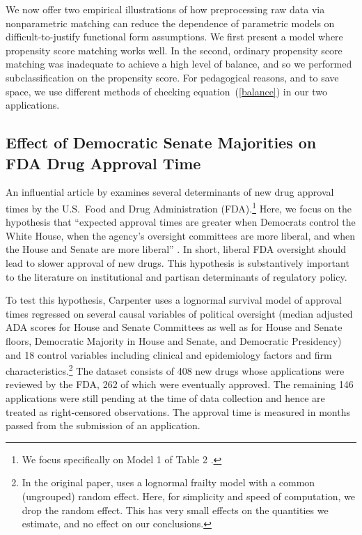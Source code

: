 \documentclass[11pt,titlepage]{article}
\begin{document}
We now offer two empirical illustrations of how preprocessing raw data
via nonparametric matching can reduce the dependence of parametric
models on difficult-to-justify functional form assumptions.  We first
present a model where propensity score matching works well.  In the
second, ordinary propensity score matching was inadequate to achieve a
high level of balance, and so we performed subclassification on the
propensity score. For pedagogical reasons, and to save space, we use
different methods of checking equation~(\ref{balance}) in our two
applications.

\subsection{Effect of Democratic Senate Majorities on FDA Drug Approval Time}

An influential article by \citet{Carp02} examines several determinants
of new drug approval times by the U.S.\ Food and Drug Administration
(FDA).\footnote{We focus specifically on Model 1 of Table 2 \citep[p.
  499]{Carp02}.}  Here, we focus on the hypothesis that ``expected
approval times are greater when Democrats control the White House,
when the agency's oversight committees are more liberal, and when the
House and Senate are more liberal'' \citep[p.495]{Carp02}.  In short,
liberal FDA oversight should lead to slower approval of new drugs.
This hypothesis is substantively important to the literature on
institutional and partisan determinants of regulatory policy.

To test this hypothesis, Carpenter uses a lognormal survival model of
approval times regressed on several causal variables of political
oversight (median adjusted ADA scores for House and Senate Committees
as well as for House and Senate floors, Democratic Majority in House
and Senate, and Democratic Presidency) and 18 control variables
including clinical and epidemiology factors and firm
characteristics.\footnote{In the original paper, \citet{Carp02} uses a
  lognormal frailty model with a common (ungrouped) random effect.
  Here, for simplicity and speed of computation, we drop the random
  effect.  This has very small effects on the quantities we estimate,
  and no effect on our conclusions.}  The dataset consists of 408 new
drugs whose applications were reviewed by the FDA, 262 of which were
eventually approved.  The remaining 146 applications were still
pending at the time of data collection and hence are treated as
right-censored observations. The approval time is measured in months
passed from the submission of an application.
\end{document}
